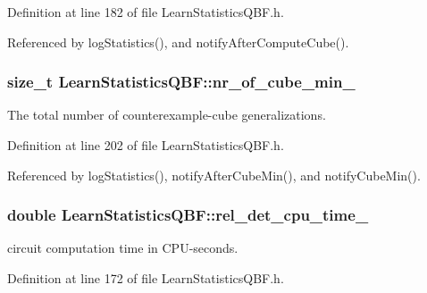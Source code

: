 Definition at line 182 of file Learn\-Statistics\-Q\-B\-F.\-h.



Referenced by log\-Statistics(), and notify\-After\-Compute\-Cube().

\hypertarget{classLearnStatisticsQBF_aff417981063fbdf94164ce7b2d1e71a2}{
\subsubsection[{nr\-\_\-of\-\_\-cube\-\_\-min\-\_\-}]{\setlength{\rightskip}{0pt plus 5cm}size\-\_\-t Learn\-Statistics\-Q\-B\-F\-::nr\-\_\-of\-\_\-cube\-\_\-min\-\_\-\hspace{0.3cm}{\ttfamily [protected]}}}\label{classLearnStatisticsQBF_aff417981063fbdf94164ce7b2d1e71a2}


The total number of counterexample-\/cube generalizations. 



Definition at line 202 of file Learn\-Statistics\-Q\-B\-F.\-h.



Referenced by log\-Statistics(), notify\-After\-Cube\-Min(), and notify\-Cube\-Min().

\hypertarget{classLearnStatisticsQBF_a38d959613268b6a6aa0decfcbe5d631c}{
\subsubsection[{rel\-\_\-det\-\_\-cpu\-\_\-time\-\_\-}]{\setlength{\rightskip}{0pt plus 5cm}double Learn\-Statistics\-Q\-B\-F\-::rel\-\_\-det\-\_\-cpu\-\_\-time\-\_\-\hspace{0.3cm}{\ttfamily [protected]}}}\label{classLearnStatisticsQBF_a38d959613268b6a6aa0decfcbe5d631c}


circuit computation time in C\-P\-U-\/seconds. 



Definition at line 172 of file Learn\-Statistics\-Q\-B\-F.\-h.



